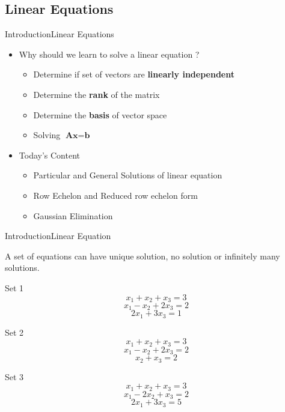 \documentclass[10pt]{beamer}
\begin{document}
\subsection{Linear Equations}
\begin{frame}{Introduction}{Linear Equations}

\begin{itemize}
\item Why should we learn to solve a linear equation ?
\pause
\begin{itemize}
\item Determine if set of vectors are \textbf{linearly independent}
\item Determine the \textbf{rank} of the matrix 
\item Determine the \textbf{basis} of vector space
\item Solving $\textbf{A}\textbf{x} = \textbf{b}$
\end{itemize}

\item Today's Content

\begin{itemize}
\item Particular and General Solutions of linear equation
\item Row Echelon and Reduced row echelon form
\item Gaussian Elimination
\end{itemize}


\end{itemize}
\end{frame}
\begin{frame}{Introduction}{Linear Equation}

A set of equations can have unique solution, no solution or infinitely many solutions.

Set 1 
$$ x_{1} + x_{2} + x_{3} = 3  $$
$$ x_{1} - x_{2} + 2x_{3} = 2 $$
$$ 2x_{1} + 3x_{3} = 1 $$

Set 2
$$ x_{1} + x_{2} + x_{3} = 3  $$
$$ x_{1} - x_{2} + 2x_{3} = 2 $$
$$ x_{2} + x_{3} = 2 $$

Set 3
$$ x_{1} + x_{2} + x_{3} = 3  $$
$$ x_{1} - 2x_{2} + x_{3} = 2 $$
$$ 2x_{1} + 3x_{3} = 5 $$

\end{frame}
\end{document}
